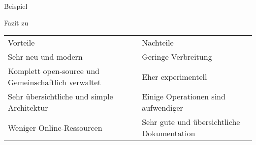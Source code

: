 \begin{frame}{Beispiel}
	\begin{minipage}{0.35\textwidth}
		\centering
	\end{minipage}
	\hfill
	\begin{minipage}{0.45\textwidth}
	\end{minipage}
\end{frame}

\begin{frame}{Fazit zu \riscv}
	\begin{table}[h]
		\begin{tabularx}{0.95\textwidth}{L|L}
			 Vorteile                       &  Nachteile               \\
			Sehr neu und modern                                 & Geringe Verbreitung                        \\
			Komplett open-source und Gemeinschaftlich verwaltet & Eher experimentell                         \\
			Sehr übersichtliche und simple Architektur          & Einige Operationen sind aufwendiger        \\
			Weniger Online-Ressourcen                           & Sehr gute und übersichtliche Dokumentation \\
		\end{tabularx}
	\end{table}
\end{frame}
